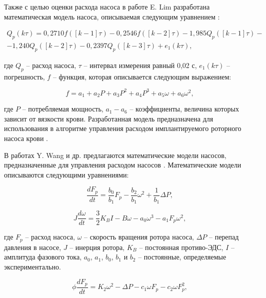 Также с целью оценки расхода насоса в работе E. Lim разработана математическая модель насоса, описываемая следующим уравнением \cite{Lim_2011}:

\begin{eqnarray}
	Q_p(k\tau) = 0,2710f([k-1]\tau) - 0,2546f([k-2]\tau) - 1,985Q_p([k-1]\tau) - \nonumber \\ - 1,240Q_p([k-2]\tau) - 0,2397Q_p([k-3]\tau) + e_1(k\tau),
	\label{eq:dynamic_model_lim}
\end{eqnarray}

\noindent где $Q_p$ -- расход насоса, $\tau$ -- интервал измерения равный 0,02 с, $e_1(k\tau)$ -- погрешность, $f$ -- функция, которая описывается следующим выражением:

\begin{equation}
	f = a_1 + a_2P + a_3P^2 + a_4P^3 + a_5\omega + a_6\omega^2,
\end{equation}

\noindent где $P$ -- потребляемая мощность, $a_1 - a_6$ -- коэффициенты, величина которых зависит от вязкости крови. Разработанная модель предназначена для использования в алгоритме управления расходом имплантируемого роторного насоса крови \cite{Lim_2011}. 

В работах Y. Wang и др. предлагаются математические модели насосов, предназначенные для управления расходом насосов \cite{wang2015rotary, wang2015suction}. Математические модели описываются следующими уравнениями:

\begin{equation}
	\frac{dF_p}{dt} = \frac{b_0}{b_1}F_p - \frac{b_2}{b_1}\omega^2 + \frac{1}{b_1}\Delta P,
	\label{eq:wang_equation_1}
\end{equation}

\begin{equation}
	J\frac{d\omega}{dt} = \frac{3}{2}K_BI - B\omega - a_0\omega^3 - a_1F_p\omega^2,
	\label{eq:wang_equation_1_speed}
\end{equation}

\noindent где $F_p$ -- расход насоса, $\omega$ -- скорость вращения ротора насоса, $\Delta P$ -- перепад давления в насосе, $J$ -- инерция ротора, $K_B$ -- постоянная противо-ЭДС, $I$ -- амплитуда фазового тока, $a_0$, $a_1$, $b_0$, $b_1$ и $b_2$ -- постоянные, определяемые экспериментально.

\begin{equation}
	\phi\frac{dF_p}{dt} = K_2\omega^2 - \Delta P - c_1\omega F_p - c_2\omega F_{p}^{2},
	\label{eq:wang_equation_2}
\end{equation}

